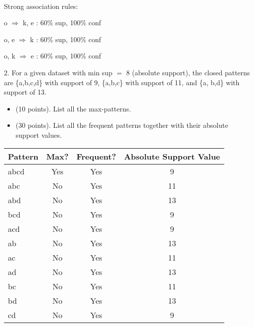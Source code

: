\documentclass[12pt]{article}
\newcommand{\mt}[1]{\ensuremath{#1}}
\newcommand{\rar}{ \mt{\Rightarrow} }     %
\newcommand{\bk}[1]{\{#1\}}
\newcommand{\eql}{\mt{=} }
\begin{document}
\

Strong association rules:

o \rar k, e : 60\% sup, 100\% conf

o, e \rar k : 60\% sup, 100\% conf

o, k \rar e : 60\% sup, 100\% conf

2. For a given dataset with min sup \eql 8 (absolute support), the closed patterns are \bk{a,b,c,d} with support of 9, \bk{a,b,c} with support of 11, and \bk{a, b,d} with support of 13.

\begin{itemize}
  \item (10 points). List all the max-patterns.
  \item (30 points). List all the frequent patterns together with their absolute support values.
\end{itemize}

\begin{tabular}{l|ccc}
  Pattern & Max? & Frequent? & Absolute Support Value \\
  \hline
  abcd & Yes & Yes & 9 \\
  abc & No & Yes & 11 \\
  abd & No & Yes & 13 \\
  bcd & No & Yes & 9 \\
  acd & No & Yes & 9 \\
  ab & No & Yes & 13 \\
  ac & No & Yes & 11 \\
  ad & No & Yes & 13 \\
  bc & No & Yes & 11 \\
  bd & No & Yes & 13 \\ 
  cd & No & Yes & 9
\end{tabular}
\end{document}
